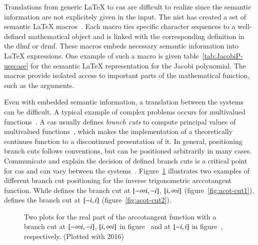 Translations from generic \LaTeX{} to \gls{cas} are difficult to realize since the semantic information are not explicitely given in the input. The \gls{nist} has created a set of semantic \LaTeX{} macros~\cite{DLMF:Macros}. Each macro ties specific character sequences to a well-defined mathematical object and is linked with the corresponding definition in the \gls{dlmf} or \gls{drmf}. These macros embeds necessary semantic information into \LaTeX{} expressions. One example of such a macro is given table~\ref{tab:JacobiP-usecase} for the semantic \LaTeX{} representation for the Jacobi polynomial. The macros provide isolated access to important parts of the mathematical function, such as the arguments. 

Even with embedded semantic information, a translation between the systems can be difficult. A typical example of complex problems occurs for multivalued functions~\parencite{AISC:MultivaluedFunctions}. A \gls*{cas} usually defines \textit{branch cuts} to compute principal values of multivalued functions~\parencite{Maple:Cuts}, which makes the implementation of a theoretically continues function to a discontinued presentation of it. In general, positioning branch cuts follows conventions, but can be positioned arbitrarily in many cases. Communicate and explain the decision of defined branch cuts is a critical point for \gls{cas} and can vary between the systems~\parencite{Branches:acot}. Figure~\ref{fig:acot-cut-compare} illustrates two examples of different branch cut positioning for the inverse trigonometric arccotangent function. While \Maple{} defines the branch cut at ${[-\infty{i}, -{i}]}$, ${[{i},\infty{i}]}$ (figure~\ref{fig:acot-cut1}), \Mathematica{} defines the branch cut at ${[-{i}, {i}]}$ (figure~\ref{fig:acot-cut2}).

\begin{figure}[ht]
    \centering
    \hspace{0.5cm}
    \caption{Two plots for the real part of the arccotangent function with a branch cut at $[-\infty{i}, -{i}]$, $[{i},\infty{i}]$ in figure~\protect{} and at $[-{i}, {i}]$ in figure~\protect{}, respectively. (Plotted with \Maple{} 2016)}
    \label{fig:acot-cut-compare}
\end{figure}

